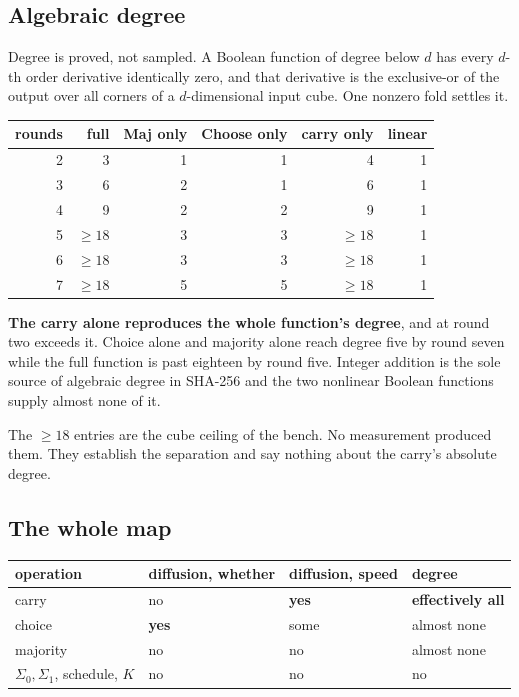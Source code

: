 \subsection{Algebraic degree}

Degree is proved, not sampled. A Boolean function of degree below \(d\) has every \(d\)-th order derivative identically zero, and that derivative is the exclusive-or of the output over all corners of a \(d\)-dimensional input cube. One nonzero fold settles it.

\begin{center}
\begin{tabular}{rrrrrr}
\toprule
rounds & full & Maj only & Choose only & carry only & linear \\
\midrule
2 & 3 & 1 & 1 & 4 & 1 \\
3 & 6 & 2 & 1 & 6 & 1 \\
4 & 9 & 2 & 2 & 9 & 1 \\
5 & \(\geq 18\) & 3 & 3 & \(\geq 18\) & 1 \\
6 & \(\geq 18\) & 3 & 3 & \(\geq 18\) & 1 \\
7 & \(\geq 18\) & 5 & 5 & \(\geq 18\) & 1 \\
\bottomrule
\end{tabular}
\end{center}

\textbf{The carry alone reproduces the whole function's degree}, and at round two exceeds it. Choice alone and majority alone reach degree five by round seven while the full function is past eighteen by round five. Integer addition is the sole source of algebraic degree in SHA-256 and the two nonlinear Boolean functions supply almost none of it.

The \(\geq 18\) entries are the cube ceiling of the bench. No measurement produced them. They establish the separation and say nothing about the carry's absolute degree.

\subsection{The whole map}

\begin{center}
\begin{tabular}{llll}
\toprule
operation & diffusion, whether & diffusion, speed & degree \\
\midrule
carry & no & \textbf{yes} & \textbf{effectively all} \\
choice & \textbf{yes} & some & almost none \\
majority & no & no & almost none \\
\(\Sigma_0, \Sigma_1\), schedule, \(K\) & no & no & no \\
\bottomrule
\end{tabular}
\end{center}

